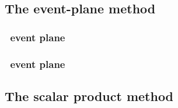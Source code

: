 \subsection{The event-plane method}

\subsubsection{\TPC\ event plane}

\subsubsection{\BBC\ event plane}

\subsection{The scalar product method}